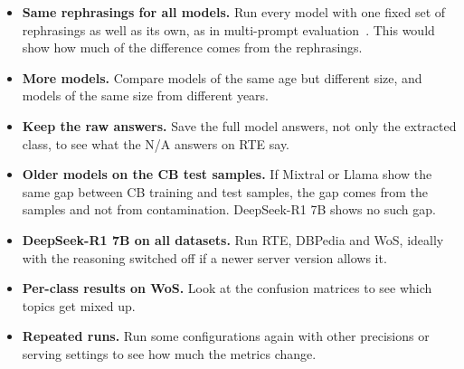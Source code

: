 \begin{itemize}
  \item \textbf{Same rephrasings for all models.} Run every model with one
  fixed set of rephrasings as well as its own, as in multi-prompt
  evaluation~\cite{Mizrahi:2024}. This would show how much of the
  difference comes from the rephrasings.
  \item \textbf{More models.} Compare models of the same age but different
  size, and models of the same size from different years.
  \item \textbf{Keep the raw answers.} Save the full model answers, not only
  the extracted class, to see what the N/A answers on RTE say.
  \item \textbf{Older models on the CB test samples.} If Mixtral or Llama
  show the same gap between CB training and test samples, the gap comes from
  the samples and not from contamination. DeepSeek-R1 7B shows no such gap.
  \item \textbf{DeepSeek-R1 7B on all datasets.} Run RTE, DBPedia and WoS,
  ideally with the reasoning switched off if a newer server version allows it.
  \item \textbf{Per-class results on WoS.} Look at the confusion matrices to
  see which topics get mixed up.
  \item \textbf{Repeated runs.} Run some configurations again with other
  precisions or serving settings to see how much the metrics change.
\end{itemize}
